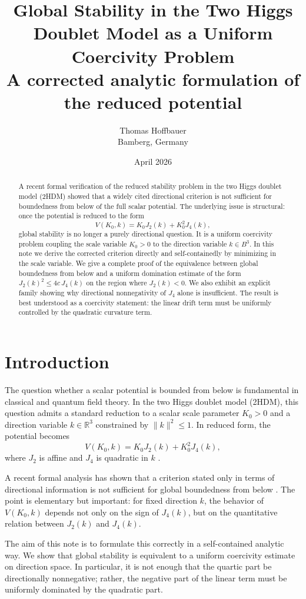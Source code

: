 \documentclass[11pt,a4paper]{article}
\title{\textbf{Global Stability in the Two Higgs Doublet Model as a Uniform Coercivity Problem}\\
\large A corrected analytic formulation of the reduced potential}
\author{Thomas Hoffbauer\\Bamberg, Germany}
\date{April 2026}
\theoremstyle{plain}
\theoremstyle{definition}
\theoremstyle{remark}
\newcommand{\R}{\mathbb{R}}
\newcommand{\norm}[1]{\lVert #1 \rVert}
\begin{document}
\maketitle

\begin{abstract}
A recent formal verification of the reduced stability problem in the two Higgs doublet model (2HDM) showed that a widely cited directional criterion is not sufficient for boundedness from below of the full scalar potential. The underlying issue is structural: once the potential is reduced to the form
\[
V(K_0,k)=K_0J_2(k)+K_0^2J_4(k),
\]
global stability is no longer a purely directional question. It is a uniform coercivity problem coupling the scale variable $K_0>0$ to the direction variable $k\in B^3$. In this note we derive the corrected criterion directly and self-containedly by minimizing in the scale variable. We give a complete proof of the equivalence between global boundedness from below and a uniform domination estimate of the form $J_2(k)^2\le 4c\,J_4(k)$ on the region where $J_2(k)<0$. We also exhibit an explicit family showing why directional nonnegativity of $J_4$ alone is insufficient. The result is best understood as a coercivity statement: the linear drift term must be uniformly controlled by the quadratic curvature term.
\end{abstract}

\section{Introduction}

The question whether a scalar potential is bounded from below is fundamental in classical and quantum field theory. In the two Higgs doublet model (2HDM), this question admits a standard reduction to a scalar scale parameter $K_0>0$ and a direction variable $k\in \R^3$ constrained by $\norm{k}^2\le 1$. In reduced form, the potential becomes
\[
V(K_0,k)=K_0J_2(k)+K_0^2J_4(k),
\]
where $J_2$ is affine and $J_4$ is quadratic in $k$ \cite{Maniatis2006,ToobySmith2026}.

A recent formal analysis has shown that a criterion stated only in terms of directional information is not sufficient for global boundedness from below \cite{ToobySmith2026}. The point is elementary but important: for fixed direction $k$, the behavior of $V(K_0,k)$ depends not only on the sign of $J_4(k)$, but on the quantitative relation between $J_2(k)$ and $J_4(k)$.

The aim of this note is to formulate this correctly in a self-contained analytic way. We show that global stability is equivalent to a uniform coercivity estimate on direction space. In particular, it is not enough that the quartic part be directionally nonnegative; rather, the negative part of the linear term must be uniformly dominated by the quadratic part.
\end{document}

